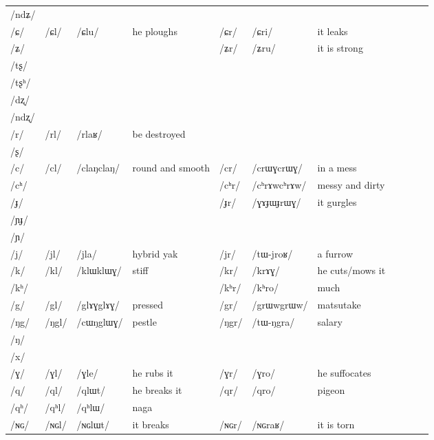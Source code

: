 \documentclass[oldfontcommands,oneside,a4paper,11pt]{article}
\newcommand{\ipa}[1]{/#1/} %
\newcommand{\deux}[1]{/#1/}
\newcommand{\tib}[1]{\cellcolor{lightgray}\textbf{#1}}
\newcommand{\idph}[1]{\cellcolor{gray}\textbf{#1}}
\begin{document}
\begin{table}
{\begin{tabular}{l|lll|lll|lll|l}
\ipa{ndʑ} 	&  	&  	&  	&  	&  	& \\	
\ipa{ɕ} 	& \deux{ɕl} 	& \ipa{ɕlu} 	&he ploughs  	& \deux{ɕr} 	& \ipa{ɕri} 	& it leaks\\	
\ipa{ʑ} 	&  	&   	&  	& \deux{ʑr} 	& \ipa{ʑru} 	&it is strong \\	
\ipa{tʂ} 	&  	&  	&  	&  	&  	& \\	
\ipa{tʂʰ} 	&  	&  	&  	&  	&  	& \\	
\ipa{dʐ} 	&  	&  	&  	&  	&  	& \\	
\ipa{ndʐ} 	&  	&  	&  	&  	&  	& \\	
\ipa{r} 	& \deux{rl} 	& \ipa{rlaʁ} 	&be destroyed  	&  	&  	& \\	
\ipa{ʂ} 	&  	&  	&  	&  	&  	& \\	
\ipa{c} 	& \deux{cl} \idph{}	& \ipa{claŋclaŋ} 	& round and smooth 	& \deux{cr} \idph{}	& \ipa{crɯɣcrɯɣ} 	& in a mess \\	
\ipa{cʰ} 	&  	&  	&  	& \deux{cʰr}\idph{} 	& \ipa{cʰrɤwcʰrɤw} 	& messy and dirty\\	
\ipa{ɟ} 	&  	&  	&  	& \deux{ɟr} \idph{}	& \ipa{ɣɤɟɯɟrɯɣ} 	& it gurgles\\	
\ipa{ɲɟ} 	&  	&  	&  	&  	&  	& \\	
\ipa{ɲ} 	&  	&  	&  	&  	&  	& \\	
\ipa{j} 	& \deux{jl} 	& \ipa{jla} 	& hybrid yak 	& \deux{jr} 	& \ipa{tɯ-jroʁ} 	&a furrow \\	
\ipa{k} 	& \deux{kl} 	& \ipa{klɯklɯɣ} 	&stiff  	& \deux{kr} 	& \ipa{krɤɣ} 	& he cuts/mows it\\	
\ipa{kʰ} 	&  	&  	&  	& \deux{kʰr} 	& \ipa{kʰro} 	&much \\	
\ipa{g} 	& \deux{gl} \idph{}	& \ipa{glɤɣglɤɣ} 	& pressed 	& \deux{gr} 	& \ipa{grɯwgrɯw} 	&matsutake \\	
\ipa{ŋg} 	& \deux{ŋgl} 	& \ipa{cɯŋglɯɣ} 	&pestle  	& \deux{ŋgr} 	& \ipa{tɯ-ŋgra} 	&salary \\	
\ipa{ŋ} 	&  	&  	&  	&  	&  	& \\	
\ipa{x} 	&  	&  	&  	&  	&  	& \\	
\ipa{ɣ} 	& \deux{ɣl} 	& \ipa{ɣle} 	&he rubs it  	& \deux{ɣr} 	& \ipa{ɣro} 	& he suffocates\\	
\ipa{q} 	& \deux{ql} 	& \ipa{qlɯt} 	& he breaks it 	& \deux{qr} 	& \ipa{qro} 	& pigeon\\	
\ipa{qʰ} 	& \deux{qʰl} \tib{}	& \ipa{qʰlɯ} 	&naga  	&  	&  	& \\	
\ipa{ɴɢ} 	& \deux{ɴɢl} 	& \ipa{ɴɢlɯt} 	& it breaks 	& \deux{ɴɢr} 	& \ipa{ɴɢraʁ} 	&it is torn \\	

\end{tabular}}
\end{table}
\end{document}
